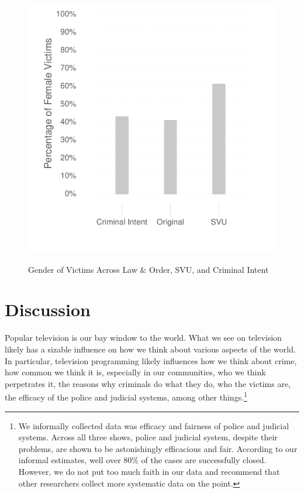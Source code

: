 \documentclass[12pt, letterpaper]{article}
\begin{document}
\begin{figure}[htbp]
\centering
\caption{Gender of Victims Across Law \& Order, SVU, and Criminal Intent}
\includegraphics[scale=.9]{../figs/all_victims_by_gender.pdf}
\label{fig:victim_sex}
\end{figure}

\section*{Discussion}
Popular television is our bay window to the world. What we see on television likely has a sizable influence on how we think about various aspects of the world. In particular, television programming likely influences how we think about crime, how common we think it is, especially in our communities, who we think perpetrates it, the reasons why criminals do what they do, who the victims are, the efficacy of the police and judicial systems, among other things.\footnote{We informally collected data was efficacy and fairness of police and judicial systems. Across all three shows, police and judicial system, despite their problems, are shown to be astonishingly efficacious and fair. According to our informal estimates, well over 80\% of the cases are successfully closed. However, we do not put too much faith in our data and recommend that other researchers collect more systematic data on the point.} 
\end{document}
